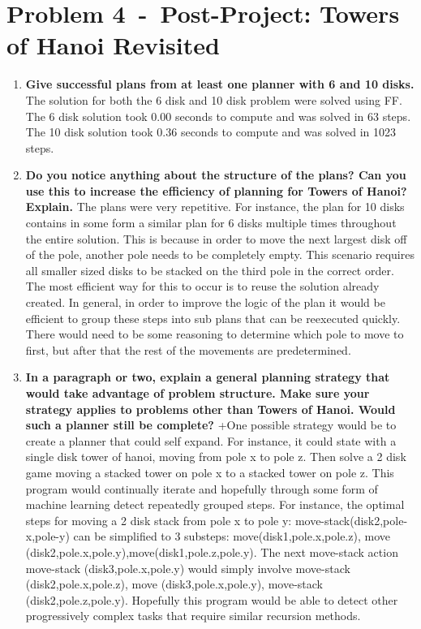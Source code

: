 \documentclass[12pt]{article}
\newcommand{\problem}[2]{\section*{Problem {#1}~-~{#2}}}
\begin{document}
\problem{4}{Post-Project: Towers of Hanoi Revisited}
\label{sec:problem_4}
\begin{enumerate}
 \item \textbf{Give successful plans from at least one planner with 6 and 10 disks.} \newline The solution for both the 6 disk and 10 disk problem were solved using FF. The 6 disk solution took 0.00 seconds to compute and was solved in 63 steps. The 10 disk solution took 0.36 seconds to compute and was solved in 1023 steps.
 \item \textbf{Do you notice anything about the structure of the plans? Can you use this to increase the
efficiency of planning for Towers of Hanoi? Explain.} \newline
   The plans were very repetitive. For instance, the plan for 10 disks contains in some form a similar plan for 6 disks multiple times throughout the entire solution. This is because in order to move the next largest disk off of the pole, another pole needs to be completely empty. This scenario requires all smaller sized disks to be stacked on the third pole in the correct order. The most efficient way for this to occur is to reuse the solution already created. In general, in order to improve the logic of the plan it would be efficient to group these steps into sub plans that can be reexecuted quickly. There would need to be some reasoning to determine which pole to move to first, but after that the rest of the movements are predetermined. 
 \item \textbf{In a paragraph or two, explain a general planning strategy that would take advantage of
problem structure. Make sure your strategy applies to problems other than Towers of Hanoi.
Would such a planner still be complete?}
+\newline One possible strategy would be to create a planner that could self expand. For instance, it could state with a single disk tower of hanoi, moving from pole x to pole z. Then solve a 2 disk game moving a stacked tower on pole x to a stacked tower on pole z. This program would continually iterate and hopefully through some form of machine learning detect repeatedly grouped steps. For instance, the optimal steps for moving a 2 disk stack from pole x to pole y: move-stack(disk2,pole-x,pole-y) can be simplified to 3 substeps: move(disk1,pole.x,pole.z), move (disk2,pole.x,pole.y),move(disk1,pole.z,pole.y). The next move-stack action \- move-stack (disk3,pole.x,pole.y) would simply involve \- move-stack (disk2,pole.x,pole.z), \- move (disk3,pole.x,pole.y), \- move-stack (disk2,pole.z,pole.y). Hopefully this program would be able to detect other progressively complex tasks that require similar recursion methods.
\end{enumerate}
\end{document}
